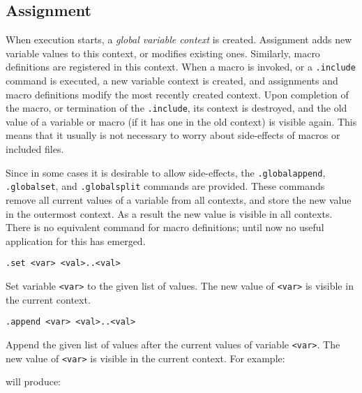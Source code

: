 \subsection{Assignment}
\label{s.assignment}
When execution starts, a \emph{global variable context} is created.
Assignment adds new variable values to this context, or modifies
existing ones. Similarly, macro definitions are registered in this context.
When a macro is invoked, or a \texttt{.include} command is executed,
a new variable context is created, and assignments and macro
definitions modify the most recently created context.  Upon completion
of the macro, or termination of the \verb'.include', its context
is destroyed, and the old value of a variable or macro (if it has
one in the old context) is visible again.  This means that it usually
is not necessary to worry about side-effects of macros or included
files.

\begin{sloppypar}
Since in some cases it is desirable to allow side-effects, the
\verb'.globalappend', \verb'.globalset', and \verb'.globalsplit'
commands are provided.  These commands remove all current values
of a variable from all contexts, and store the new value in the
outermost context. As a result the new value is visible in all
contexts. There is no equivalent command for macro definitions; until now
no useful application for this has emerged.
\end{sloppypar}
\begin{verbatim}
.set <var> <val>..<val>
\end{verbatim}
\begin{desc}
Set variable \texttt{<var>} to the given list of values.
The new value of \texttt{<var>} is visible in the current context.
\end{desc}
\begin{verbatim}
.append <var> <val>..<val>
\end{verbatim}
\begin{desc}
Append the given list of values after the current values of variable
\texttt{<var>}.
The new value of \texttt{<var>} is visible in the current context.
For example:
\begin{showfile}

\end{showfile}
will produce:
\begin{showfile}

\end{showfile}
\end{desc}

